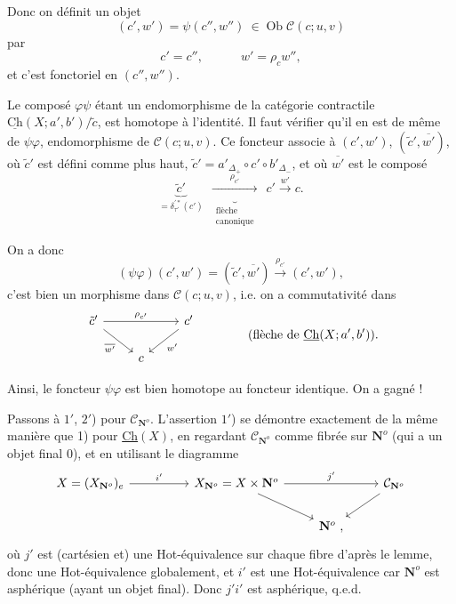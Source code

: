 \documentclass[11pt]{article}
\newcommand{\printedpage}[1]{\marginpar{\footnotesize p.~#1}}
\newcommand{\msp}[1]{\marginpar{\footnotesize [#1]}}
\newcommand{\Ch}{\underline{\mathrm{Ch}}}
\newcommand{\cC}{\mathcal{C}}
\newcommand{\Ob}{\operatorname{Ob}}
\newcommand{\CN}{\mathcal{C}_{\mathbf{N}^o}}
\begin{document}
\msp{page 165}
Donc on définit un objet
\[
(c',w') = \psi(c'',w'')\ \in \Ob \cC(c;u,v)
\]
par
\[
c' = c'', \qquad\quad w' = \rho_c w'',
\]
et c'est fonctoriel en $(c'',w'')$.

Le composé $\varphi\psi$ étant un endomorphisme de la catégorie contractile $\Ch(X;a',b')/\tilde{c}$, est homotope à l'identité. Il faut vérifier qu'il en est de même de $\psi\varphi$, endomorphisme de $\cC(c;u,v)$. Ce foncteur associe à $(c',w')$, $(\tilde{c}',\overline{w'})$, où $\tilde{c}'$ est défini comme plus haut, $\tilde{c}' = a'_{\Delta_{+}} \circ c' \circ b'_{\Delta_{-}}$, et où $\overline{w'}$ est le composé
\[
\underbrace{\tilde{c}'}_{= \delta^{\prime *}_{\tau'}(c')}\ \ \underbrace{\xrightarrow{\ \rho_{c'}\ }}_{\substack{\text{flèche}\\ \text{canonique}}}\ \ c' \xrightarrow{w'} c.
\]

On a donc
\[
(\psi\varphi)(c',w') = (\tilde{c}',\overline{w'}) \xrightarrow{\rho_{c'}} (c',w'),
\]
c'est bien un morphisme dans $\cC(c;u,v)$, i.e. on a commutativité dans
\[
\begin{tikzcd}
\tilde{c}' \ar[rr,"\rho_{c'}"] \ar[dr,"\overline{w'}"'] & & c' \ar[dl,"w'"] \\
& c &
\end{tikzcd}
\qquad\qquad \text{(flèche de } \Ch(X;a',b')\text{).}
\]

\printedpage{104}
\msp{page 166}

Ainsi, le foncteur $\psi\varphi$ est bien homotope au foncteur identique. On a gagné !

Passons à $1'$, $2'$) pour $\CN$. L'assertion $1'$) se démontre exactement de la même manière que 1) pour \underline{Ch}$(X)$, en regardant $\CN$ comme fibrée sur $\mathbf{N}^o$ (qui a un objet final 0), et en utilisant le diagramme
\[
\begin{tikzcd}
X = (X_{\mathbf{N}^o})_e \arrow[rr, "i'"] & & X_{\mathbf{N}^o} = X \times \mathbf{N}^o \arrow[rr, "j'"] \arrow[dr] & & \mathcal{C}_{\mathbf{N}^o} \arrow[dl] \\
 & & & \mathbf{N}^o \ , &
\end{tikzcd}
\]
où $j'$ est (cartésien et) une Hot-équivalence sur chaque fibre d'après le lemme, donc une Hot-équivalence globalement, et $i'$ est une Hot-équivalence car $\mathbf{N}^o$ est asphérique (ayant un objet final). Donc $j'i'$ est asphérique, q.e.d.
\end{document}
